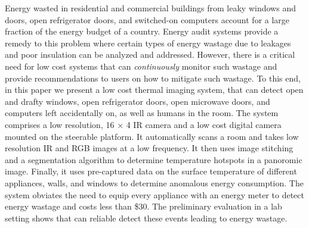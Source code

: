 Energy wasted in residential and commercial buildings from leaky windows and doors, open refrigerator doors, and switched-on computers account for a large fraction of the energy budget of a country. Energy audit systems provide a remedy to this problem where certain types of energy wastage due to leakages and poor insulation can be analyzed and addressed. However, there is a critical need for low cost systems that can {\em continuously} monitor such wastage and provide recommendations to users on how to mitigate such wastage. To this end, in this paper we present a low cost thermal imaging system, {\IRLeak} that can detect open and drafty windows, open refrigerator doors, open microwave doors, and computers left accidentally on, as well as humans in the room. The system comprises a low resolution, 16 $\times$ 4 IR camera
and a low cost digital camera mounted on the steerable platform. It automatically scans a room and takes low resolution IR and RGB images at a low frequency. It then uses image stitching and a segmentation algorithm to determine temperature hotspots in a panoromic image. Finally, it uses pre-captured data on the surface temperature of different appliances, walls, and windows to determine anomalous energy consumption. The system obviates the need to equip every appliance with an energy meter to detect energy wastage and costs less than \$30. The preliminary evaluation in a lab setting shows that {\IRLeak} can reliable detect these events leading to energy wastage.

